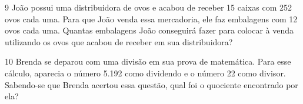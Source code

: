 \num{9} João possui uma distribuidora de ovos e acabou de receber 15 caixas com 252
ovos cada uma. Para que João venda essa mercadoria, ele faz embalagens
com 12 ovos cada uma. Quantas embalagens João conseguirá fazer para
colocar à venda utilizando os ovos que acabou de receber em sua distribuidora?




\num{10} Brenda se deparou com uma divisão em sua prova de matemática. Para esse
cálculo, aparecia o número 5.192 como dividendo e o número 22 como divisor. Sabendo-se que
Brenda acertou essa questão, qual foi o quociente encontrado por ela?



